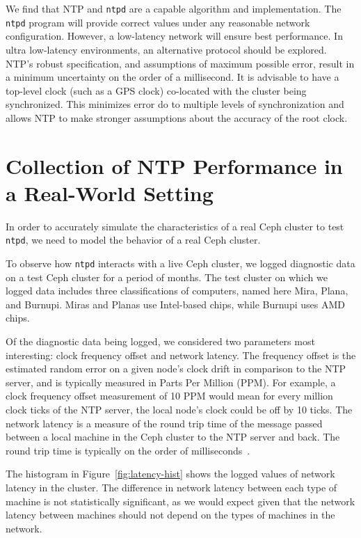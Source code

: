 We find that NTP and \texttt{ntpd} are a capable algorithm and implementation.
The \texttt{ntpd} program will provide correct values under any reasonable 
network configuration. However, a low-latency network will ensure best 
performance. In ultra low-latency environments, an alternative protocol 
should be explored. NTP's robust specification, and assumptions of maximum possible
error, result in a minimum uncertainty on the order of a millisecond. 
It is advisable to have a top-level clock (such as a GPS clock)
co-located with the cluster being synchronized. This minimizes error do to
multiple levels of synchronization and allows NTP to make stronger assumptions
about the accuracy of the root clock. 



\section{Collection of NTP Performance in a Real-World Setting}

In order to accurately simulate the
characteristics of a real Ceph cluster to test \texttt{ntpd}, we need to model the
behavior of a real Ceph cluster.

To observe how \texttt{ntpd} interacts with a live Ceph cluster,
we logged diagnostic data on a test Ceph cluster for a period of months.
The test cluster on which we logged data includes 
three classifications of computers, named here Mira,
Plana, and Burnupi. Miras and Planas use Intel-based chips, while
Burnupi uses AMD chips.

Of the diagnostic data being logged, 
we considered two parameters most interesting: clock frequency offset and
network latency. 
The frequency offset is the estimated random error on a given node's
clock drift in comparison to the NTP server, and is typically measured in Parts
Per Million (PPM). For example, a clock frequency offset measurement of 10 PPM would
mean for every million clock ticks of the NTP server, the local
node's clock could be off by 10 ticks. The network latency is a measure of
the round trip time of the message passed between a local machine in
the Ceph cluster to the NTP server and back. The round trip time
is typically on the order of milliseconds~\citep{Sage}.

The histogram in Figure~\ref{fig:latency-hist} shows the logged
values of network latency in the cluster. The 
difference in network latency between each type of machine is not
statistically significant, as we would expect given that the network
latency between machines should not depend on the types of 
machines in the network. 

